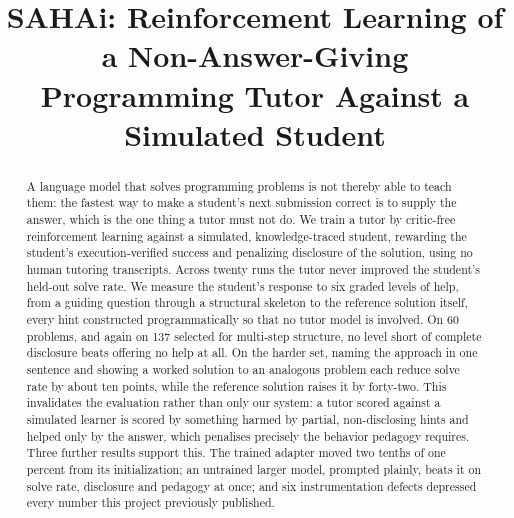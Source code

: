 \documentclass[conference]{IEEEtran}
\begin{document}
\title{SAHAi: Reinforcement Learning of a Non-Answer-Giving\\Programming Tutor Against a Simulated Student}

\author{
}

\maketitle

\begin{abstract}
A language model that solves programming problems is not thereby able to teach
them: the fastest way to make a student's next submission correct is to supply
the answer, which is the one thing a tutor must not do. We train a tutor by
critic-free reinforcement learning against a simulated, knowledge-traced
student, rewarding the student's execution-verified success and penalizing
disclosure of the solution, using no human tutoring transcripts. Across twenty
runs the tutor never improved the student's held-out solve rate. We measure the
student's response to six graded levels of help, from a guiding question
through a structural skeleton to the reference solution itself, every hint
constructed programmatically so that no tutor model is involved. On 60
problems, and again on 137 selected for multi-step structure, no level short of
complete disclosure beats offering no help at all. On the
harder set, naming the approach in one sentence and showing a worked solution to
an analogous problem each reduce solve rate by about ten points, while the
reference solution raises it by forty-two. This invalidates the evaluation
rather than only our system: a tutor scored against a simulated learner is
scored by something harmed by partial, non-disclosing hints and helped only by
the answer, which penalises precisely the behavior pedagogy requires. Three further results
support this. The trained adapter moved two tenths of one percent from its
initialization; an untrained larger model, prompted plainly, beats it on solve
rate, disclosure and pedagogy at once; and six instrumentation defects
depressed every number this project previously published.
\end{abstract}
\end{document}
